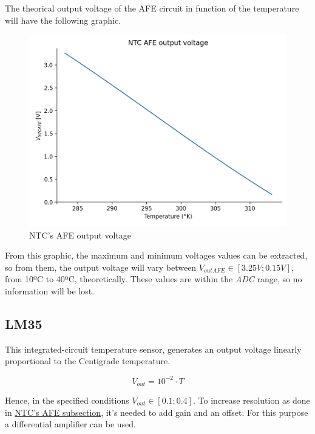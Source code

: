 \documentclass[12pt]{article}
\begin{document}
    The theorical output voltage of the AFE circuit in function of the temperature will have the
    following graphic.
    \begin{figure}[H] 
        \centering
        \includegraphics*[scale = 0.6]{images/outuptafentc.png}
        \caption{NTC's AFE output voltage}
        \label{wrap-fig:1}
    \end{figure}

    From this graphic, the maximum and minimum voltages values can be extracted, so from them, the output voltage 
    will vary between $V_{outAFE} \in [3.25V;0.15V]$, from 10ºC to 40ºC, theoretically. These values are within the \textit{ADC} range, so no information will be lost.
\subsection{LM35}

    This integrated-circuit temperature sensor, generates an output
    voltage linearly proportional to the Centigrade temperature.

    $$V_{out} = 10^{-2}\cdot T$$

    Hence, in the specified conditions $V_{out}\in[0.1;0.4]$. 
    To increase resolution as done in \hyperref[AFENTC]{NTC's AFE subsection},
    it's needed to add gain and an offset. 
    For this purpose a differential amplifier can be used.  
    
\end{document}

